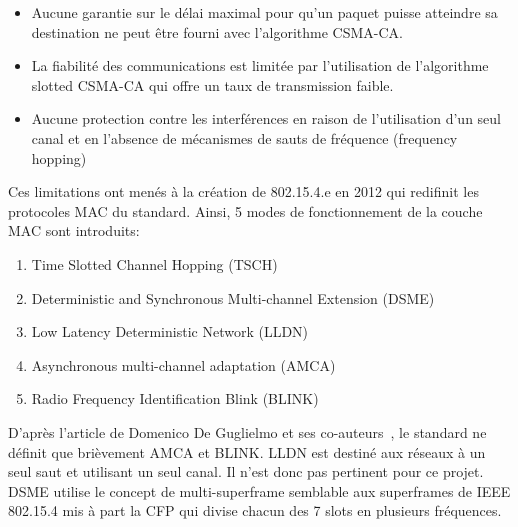    \begin{itemize}
      \item Aucune garantie sur le délai maximal pour qu'un paquet puisse atteindre sa destination
        ne peut être fourni avec l'algorithme CSMA-CA.
      \item La fiabilité des communications est limitée par l'utilisation de l'algorithme slotted   CSMA-CA qui offre un taux de transmission faible.
      \item Aucune protection contre les interférences en raison de l'utilisation d'un seul canal et en l'absence de mécanismes de sauts de fréquence (frequency hopping)
    \end{itemize}
    Ces limitations ont menés à la création de 802.15.4.e en 2012 qui redifinit les protocoles MAC du  standard.
    Ainsi, 5 modes de fonctionnement de la couche MAC sont introduits:
    \begin{enumerate}
      \item Time Slotted Channel Hopping (TSCH)
      \item Deterministic and Synchronous Multi-channel Extension (DSME)
      \item Low Latency Deterministic Network (LLDN)
      \item Asynchronous multi-channel adaptation (AMCA)
      \item Radio Frequency Identification Blink (BLINK)
    \end{enumerate}
    D'après l'article de Domenico De Guglielmo et ses co-auteurs~\cite{paper:802.15.4e-survey}, le standard ne définit que brièvement AMCA et BLINK.
    LLDN est destiné aux réseaux à un seul saut et utilisant un seul canal. Il n'est donc pas pertinent pour ce projet. DSME utilise le concept de multi-superframe semblable aux superframes de IEEE 802.15.4 mis à part la CFP qui divise chacun des 7 slots en plusieurs fréquences.


